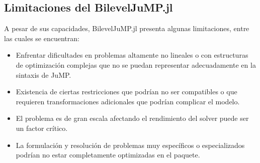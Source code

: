 \subsection{Limitaciones del BilevelJuMP.jl}

A pesar de sus capacidades, BilevelJuMP.jl presenta algunas limitaciones, entre las cuales se encuentran:

\begin{itemize}
    \item Enfrentar dificultades en problemas altamente no lineales o con estructuras de optimización complejas que no se puedan representar adecuadamente en la sintaxis de JuMP.
    \item Existencia de ciertas restricciones que podrían no ser compatibles o que requieren transformaciones adicionales que podrían complicar el modelo.
    \item El problema es de gran escala afectando el rendimiento del solver puede ser un factor crítico.
    \item La formulación y resolución de problemas muy específicos o especializados podrían no estar completamente optimizadas en el paquete.
\end{itemize}


